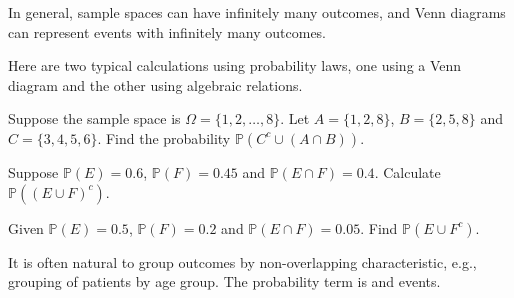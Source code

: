 \documentclass[../main.tex]{subfiles}
\begin{document}
\faExclamationTriangle{} In general, sample spaces can have infinitely many outcomes, and Venn diagrams can represent events with infinitely many outcomes.
\clearpage


Here are two typical calculations using probability laws, one using a Venn diagram and the other using algebraic relations.

\begin{example} \label{ex:probability-laws-venn}
  Suppose the sample space is \(\Omega = \{1,2,\ldots,8\}\). Let \(A = \{1,2,8\}\), \(B = \{2,5,8\}\) and \(C = \{3,4,5,6\}\).  Find the probability \(\mathbb{P}( C^{c} \cup (A \cap B) )\).
  
\end{example}

\begin{example} \label{ex:probability-laws-algebraic}
  Suppose \(\mathbb{P}(E) = 0.6\), \(\mathbb{P}(F) = 0.45\) and \(\mathbb{P}(E \cap F) = 0.4\). Calculate \(\mathbb{P}( (E \cup F)^{c})\).

\end{example}

\begin{exercise} \label{ex:probability-laws-practice}
  Given \(\mathbb{P}(E) = 0.5\), \(\mathbb{P}(F) = 0.2\) and \(\mathbb{P}(E \cap F) = 0.05\). Find \(\mathbb{P}(E \cup F^{c})\).

  \blanks*
\end{exercise}
\clearpage

%
%
%

It is often natural to group outcomes by non-overlapping characteristic, e.g., grouping of patients by age group. The probability term is  and  events.
\end{document}
